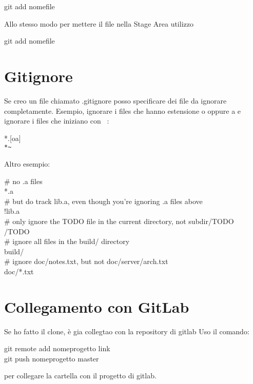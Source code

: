 \begin{tcolorbox}
git add nomefile
\end{tcolorbox}

Allo stesso modo per mettere il file nella Stage Area utilizzo

\begin{tcolorbox}
git add nomefile
\end{tcolorbox}

\section{Gitignore}
Se creo un file chiamato .gitignore posso specificare dei file da ignorare completamente. Esempio, ignorare i files che hanno estensione o oppure a e ignorare i files che iniziano con ~:

\begin{tcolorbox}
*.[oa]\\
\verb|*~|
\end{tcolorbox}

Altro esempio:

\begin{tcolorbox}
\# no .a files\\
*.a\\
\# but do track lib.a, even though you're ignoring .a files above\\
!lib.a\\
\# only ignore the TODO file in the current directory, not subdir/TODO\\
/TODO\\
\# ignore all files in the build/ directory\\
build/\\
\# ignore doc/notes.txt, but not doc/server/arch.txt\\
doc/*.txt\\
\end{tcolorbox}

\section{Collegamento con GitLab}
Se ho fatto il clone, è gia collegtao con la repository di gitlab
Uso il comando:

\begin{tcolorbox}
git remote add nomeprogetto link\\
git push nomeprogetto master
\end{tcolorbox}
per collegare la cartella con il progetto di gitlab.

